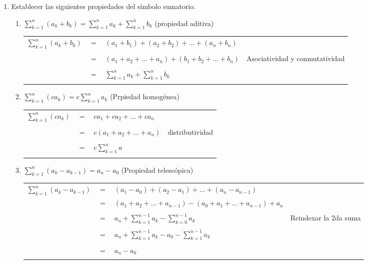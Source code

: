 \begin{enumerate}[\bfseries  1.]
\item Establecer las siguientes propiedades del símbolo sumatorio. 
\begin{enumerate}[\bfseries a)]
\item $\displaystyle\sum_{k=1}^{n}(a_k + b_k) = \sum_{k=1}^n a_k + \sum_{k=1}^{n} b_k$ (propiedad aditiva)
\begin{center}
\begin{tabular}{r c l l}
$\displaystyle\sum_{k=1}^{n}(a_k + b_k)$&$=$&$(a_1 + b_1) + (a_2 + b_2) + ... + (a_n + b_n)$&\\\\
&$=$&$(a_1 + a_2 + ... + a_n) + (b_1 + b_2 + ... + b_n)$&Asociatividad y conmutatividad\\\\
&$=$&$\displaystyle\sum_{k=1}^{n} a_k + \sum_{k=1}^{n} b_k$&\\\\
\end{tabular}
\end{center}
\item $\displaystyle\sum_{k=1}^{n} (ca_k) = c \sum_{k=1}^{n} a_k$ (Prpiedad homogénea)
\begin{center}
\begin{tabular}{r c l l}
$\displaystyle\sum_{k=1}^{n} (ca_k)$&$=$&$ca_1 + ca_2 + ... + ca_n$&\\\\
&$=$&$c(a_1 + a_2 +...+a_n)$&distributividad\\\\
&$=$&$ c \displaystyle\sum_{k=1}^{n} a$&\\\\
\end{tabular}
\end{center}
\item $\displaystyle\sum_{k=1}^{n} (a_k - a_{k-1}) = a_n - a_0$ (Propiedad telescópica)
\begin{center}
\begin{tabular}{r c l l}
$\displaystyle\sum_{k=1}^{n} (a_k - a_{k-1})$&$=$&$(a_1-a_0)+(a_2-a_1)+...+(a_n-a_{n-1})$&\\
&$=$&$(a_1+a_2+...+a_{n-1})-(a_0+a_1+...+a_{n-1})+a_n$&\\\\
&$=$&$a_n + \displaystyle\sum_{k=1}^{n-1} a_k - \sum_{k=0}^{n-1} a_k$&Reindexar la 2da suma\\\\
&$=$&$a_n + \displaystyle\sum_{k=1}^{n-1} a_k - a_0 - \sum_{k=1}^{n-1} a_k$&\\\\
&$=$&$a_n - a_0$&\\\\
\end{tabular}
\end{center}
\end{enumerate}


\end{enumerate}
